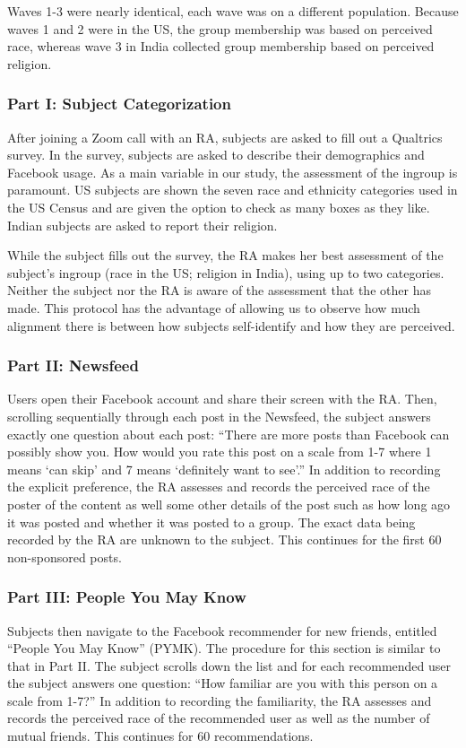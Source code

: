 \documentclass[12pt,letterpaper]{article}
\begin{document}
Waves 1-3 were nearly identical, each wave was on a different population. Because waves 1 and 2 were in the US, the group membership was based on perceived race, whereas wave 3 in India collected group membership based on perceived religion.

\subsubsection{Part I: Subject Categorization} After joining a Zoom call with an RA, subjects are asked to fill out a Qualtrics survey. In the survey, subjects are asked to describe their demographics and Facebook usage. As a main variable in our study, the assessment of the ingroup is paramount. US subjects are shown the seven race and ethnicity categories used in the US Census and are given the option to check as many boxes as they like. Indian subjects are asked to report their religion.

While the subject fills out the survey, the RA makes her best assessment of the subject’s ingroup (race in the US; religion in India), using up to two categories. Neither the subject nor the RA is aware of the assessment that the other has made. This protocol has the advantage of allowing us to observe how much alignment there is between how subjects self-identify and how they are perceived.

\subsubsection{Part II: Newsfeed} Users open their Facebook account and share their screen with the RA. Then, scrolling sequentially through each post in the Newsfeed, the subject answers exactly one question about each post: “There are more posts than Facebook can possibly show you. How would you rate this post on a scale from 1-7 where 1 means ‘can skip’ and 7 means ‘definitely want to see’.” In addition to recording the explicit preference, the RA assesses and records the perceived race of the poster of the content as well some other details of the post such as how long ago it was posted and whether it was posted to a group. The exact data being recorded by the RA are unknown to the subject. This continues for the first 60 non-sponsored posts.

\subsubsection{Part III: People You May Know} Subjects then navigate to the Facebook recommender for new friends, entitled “People You May Know” (PYMK). The procedure for this section is similar to that in Part II. The subject scrolls down the list and for each recommended user the subject answers one question: “How familiar are you with this person on a scale from 1-7?” In addition to recording the familiarity, the RA assesses and records the perceived race of the recommended user as well as the number of mutual friends. This continues for 60 recommendations.
\end{document}
